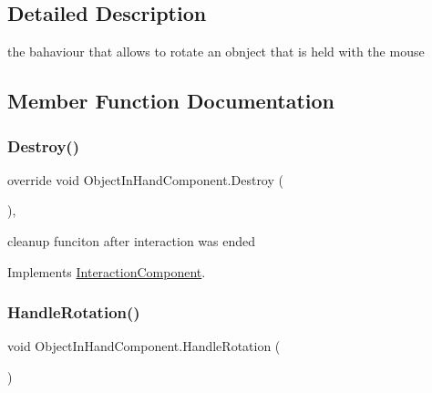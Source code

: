 \subsection{Detailed Description}
the bahaviour that allows to rotate an obnject that is held with the mouse 



\subsection{Member Function Documentation}
\mbox{\label{class_object_in_hand_component_a932b69c4977ec0836389b71a6aa1366c}} 
\subsubsection{\texorpdfstring{Destroy()}{Destroy()}}
{\footnotesize\ttfamily override void Object\+In\+Hand\+Component.\+Destroy (\begin{DoxyParamCaption}{ }\end{DoxyParamCaption})\hspace{0.3cm}{\ttfamily [protected]}, {\ttfamily [virtual]}}



cleanup funciton after interaction was ended 



Implements \mbox{\hyperlink{class_interaction_component_aa28f5c9f92b342c3d52f8b0b251fb4fa}{Interaction\+Component}}.

\mbox{\label{class_object_in_hand_component_aa00e6e5af513b7c24e36e7e74b1f7ae4}} 
\subsubsection{\texorpdfstring{Handle\+Rotation()}{HandleRotation()}}
{\footnotesize\ttfamily void Object\+In\+Hand\+Component.\+Handle\+Rotation (\begin{DoxyParamCaption}{ }\end{DoxyParamCaption})\hspace{0.3cm}{\ttfamily [private]}}



